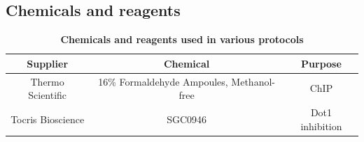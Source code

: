 \documentclass[11pt,twoside,a4paper]{report}
\begin{document}
		\subsection{Chemicals and reagents}
		
			\begin{table}[H]
       		\caption{\bf{Chemicals and reagents used in various protocols}}
        		\begin{center}
            		\begin{tabular}{c|c|c}
	               		Supplier & Chemical & Purpose\\
    		            \hline
    		            Thermo Scientific & 16\% Formaldehyde Ampoules, Methanol-free & ChIP\\
    		            Tocris Bioscience & SGC0946 & Dot1 inhibition\\
	            	\end{tabular}
    		    \end{center}
		    \end{table}
    
\end{document}
